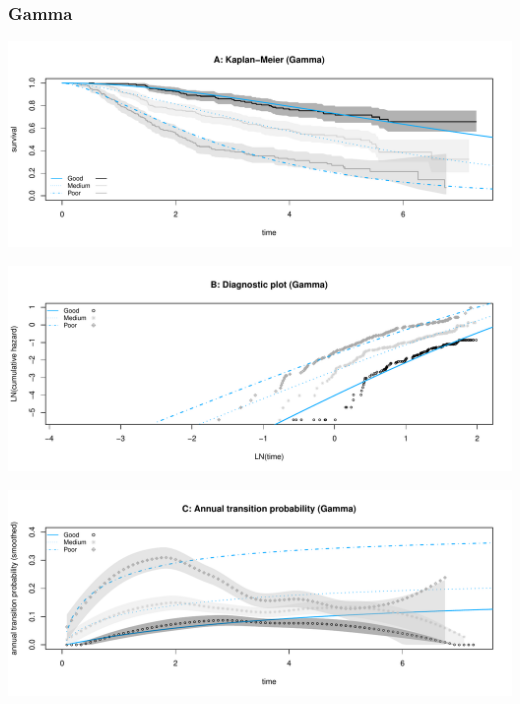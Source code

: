 \documentclass[
]{article}
\begin{document}
\clearpage

\subsubsection{Gamma}\label{gamma}

\begin{flushleft}\includegraphics[height=0.25\textheight]{BC_OS_output/Images/Figure_param_models-16} \end{flushleft}

\begin{flushleft}\includegraphics[height=0.25\textheight]{BC_OS_output/Images/Figure_param_models-17} \end{flushleft}

\begin{flushleft}\includegraphics[height=0.25\textheight]{BC_OS_output/Images/Figure_param_models-18} \end{flushleft}
\end{document}
